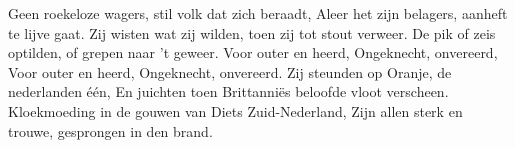 \beginverse*
Geen roekeloze wagers, stil volk dat zich beraadt,
Aleer het zijn belagers, aanheft te lijve gaat.
Zij wisten wat zij wilden, toen zij tot stout verweer. 
De pik of zeis optilden, of grepen naar 't geweer.
\endverse
\beginchorus
Voor outer en heerd,
Ongeknecht, onvereerd,
Voor outer en heerd,
Ongeknecht, onvereerd.
\endchorus
\beginverse*
Zij steunden op Oranje, de nederlanden één,
En juichten toen Brittanniës beloofde vloot verscheen.
Kloekmoeding in de gouwen van Diets Zuid-Nederland,
Zijn allen sterk en trouwe, gesprongen in den brand.
\endverse
\endsong